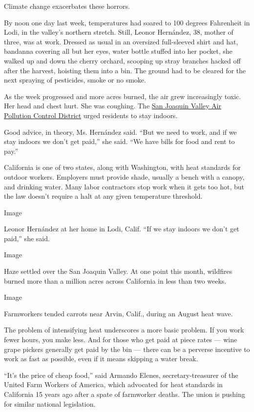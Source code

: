 Climate change exacerbates these horrors.

By noon one day last week, temperatures had soared to 100 degrees
Fahrenheit in Lodi, in the valley's northern stretch. Still, Leonor
Hernández, 38, mother of three, was at work. Dressed as usual in an
oversized full-sleeved shirt and hat, bandanna covering all but her
eyes, water bottle stuffed into her pocket, she walked up and down the
cherry orchard, scooping up stray branches hacked off after the harvest,
hoisting them into a bin. The ground had to be cleared for the next
spraying of pesticides, smoke or no smoke.

As the week progressed and more acres burned, the air grew increasingly
toxic. Her head and chest hurt. She was coughing. The
\href{https://www.valleyair.org/recent_news/Media_releases/2020/HC-Smoke-Impacts-from-various-wildfires-08-21-20.pdf}{San
Joaquin Valley Air Pollution Control District} urged residents to stay
indoors.

Good advice, in theory, Ms. Hernández said. ``But we need to work, and
if we stay indoors we don't get paid,'' she said. ``We have bills for
food and rent to pay.''

California is one of two states, along with Washington, with heat
standards for outdoor workers. Employers must provide shade, usually a
bench with a canopy, and drinking water. Many labor contractors stop
work when it gets too hot, but the law doesn't require a halt at any
given temperature threshold.

Image

Leonor Hernández at her home in Lodi, Calif. ``If we stay indoors we
don't get paid,'' she said.

Image

Haze settled over the San Joaquin Valley. At one point this month,
wildfires burned more than a million acres across California in less
than two weeks.

Image

Farmworkers tended carrots near Arvin, Calif., during an August heat
wave.

The problem of intensifying heat underscores a more basic problem. If
you work fewer hours, you make less. And for those who get paid at piece
rates --- wine grape pickers generally get paid by the bin --- there can
be a perverse incentive to work as fast as possible, even if it means
skipping a water break.

``It's the price of cheap food,'' said Armando Elenes,
secretary-treasurer of the United Farm Workers of America, which
advocated for heat standards in California 15 years ago after a spate of
farmworker deaths. The union is pushing for similar national
legislation.


